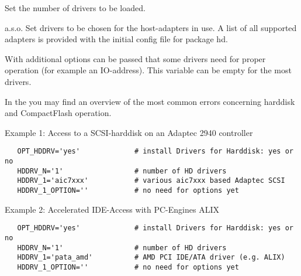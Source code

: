 \begin{description}
{
	Set the number of drivers to be loaded.
}

{
         a.s.o. Set drivers to be chosen for the host-adapters
        in use. A list of all supported adapters is provided with the initial 
        config file for package hd.
}

{
        With  additional options can be passed that some 
        drivers need for proper operation (for example an IO-address). This 
        variable can be empty for the most drivers.
}

    In the  you may find an overview of the most common 
    errors concerning harddisk and CompactFlash operation.

    Example 1: Access to a SCSI-harddisk on an Adaptec 2940 controller

\begin{example}
\begin{verbatim}
   OPT_HDDRV='yes'             # install Drivers for Harddisk: yes or no
   HDDRV_N='1'                 # number of HD drivers
   HDDRV_1='aic7xxx'           # various aic7xxx based Adaptec SCSI 
   HDDRV_1_OPTION=''           # no need for options yet
\end{verbatim}
\end{example}

    Example 2: Accelerated IDE-Access with PC-Engines ALIX

\begin{example}
\begin{verbatim}
   OPT_HDDRV='yes'             # install Drivers for Harddisk: yes or no
   HDDRV_N='1'                 # number of HD drivers
   HDDRV_1='pata_amd'          # AMD PCI IDE/ATA driver (e.g. ALIX) 
   HDDRV_1_OPTION=''           # no need for options yet
\end{verbatim}
\end{example}

\end{description}
